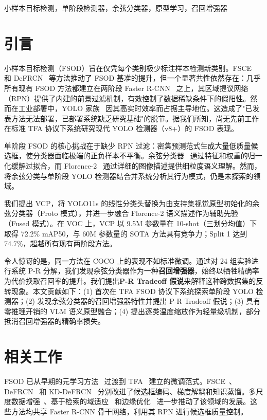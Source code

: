 \documentclass[conference]{IEEEtran}
\begin{document}
\begin{IEEEkeywords}
小样本目标检测，单阶段检测器，余弦分类器，原型学习，召回增强器
\end{IEEEkeywords}

\section{引言}

小样本目标检测（FSOD）旨在仅凭每个类别极少标注样本检测新类别。FSCE~\cite{sun2021fsce} 和 DeFRCN~\cite{qiao2021defrcn} 等方法推动了 FSOD 基准的提升，但一个显著共性依然存在：几乎所有现有 FSOD 方法都建立在两阶段 Faster R-CNN~\cite{ren2015faster} 之上，其区域提议网络（RPN）提供了内建的前景过滤机制，有效控制了数据稀缺条件下的假阳性。然而在工业部署中，YOLO 家族~\cite{terven2023yolo,jocher2023ultralytics} 因其高实时效率而占据主导地位。这造成了"已发表方法无法部署，已部署系统缺乏研究基础"的脱节。据我们所知，尚无先前工作在标准 TFA 协议下系统研究现代 YOLO 检测器（v8+）的 FSOD 表现。

单阶段 FSOD 的核心挑战在于缺少 RPN 过滤：密集预测范式生成大量低质量候选框，使分类器面临极端的正负样本不平衡。余弦分类器~\cite{wang2020tfa} 通过特征和权重的归一化缓解过拟合，而 Florence-2~\cite{xiao2024florence2} 通过详细的图像描述提供细粒度语义理解。然而，将余弦分类与单阶段 YOLO 检测器结合并系统分析其行为模式，仍是未探索的领域。

我们提出 VCP，将 YOLO11s 的线性分类头替换为由支持集视觉原型初始化的余弦分类器（Proto 模式），并进一步融合 Florence-2 语义描述作为辅助先验（Fused 模式）。在 VOC 上，VCP 以 9.5M 参数量在 10-shot（三划分均值）下取得 72.2\% mAP50，与 60M 参数量的 SOTA 方法具有竞争力；Split 1 达到 74.7\%，超越所有现有两阶段方法。

令人惊讶的是，同一方法在 COCO 上的表现不如标准微调。通过对 24 组实验进行系统 P-R 分解，我们发现余弦分类器作为一种\textbf{召回增强器}，始终以牺牲精确率为代价换取召回率的提升。我们提出\textbf{P-R Tradeoff 假说}来解释这种跨数据集的反转现象。本文贡献如下：(1) 首次在 TFA FSOD 协议下系统探索单阶段 YOLO 检测器；(2) 发现余弦分类器的召回增强器特性并提出 P-R Tradeoff 假说；(3) 具有零推理开销的 VLM 语义原型融合；(4) 提出逐类温度缩放作为轻量级机制，部分抵消召回增强器的精确率损失。

\section{相关工作}

FSOD 已从早期的元学习方法~\cite{huang2025prototype,gao2025decoupling} 过渡到 TFA~\cite{wang2020tfa} 建立的微调范式。FSCE~\cite{sun2021fsce}、DeFRCN~\cite{qiao2021defrcn} 和 KD-DeFRCN~\cite{pei2022kddefrcn} 分别改进了候选框编码、梯度解耦和知识蒸馏。多尺度数据增强~\cite{vu2025multiperspective}、基于检索的域适应~\cite{li2025domainrag} 和边缘优化~\cite{li2021cme} 进一步推动了该领域的发展。这些方法均共享 Faster R-CNN 骨干网络，利用其 RPN 进行候选框质量控制。
\end{document}
